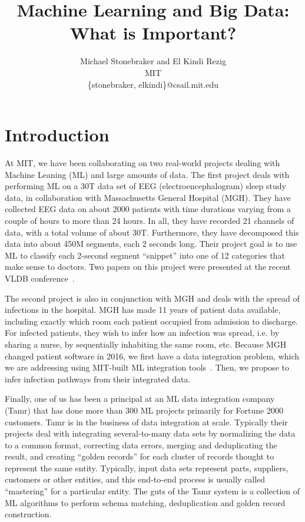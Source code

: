 \documentclass[11pt]{article}
\begin{document}
\title{Machine Learning and Big Data:\\What is Important?}
\author{Michael Stonebraker and El Kindi Rezig\\MIT\\\{stonebraker, elkindi\}@csail.mit.edu}


\section{Introduction}

At MIT, we have been collaborating on two real-world projects dealing with Machine Leaning (ML) and large amounts of data.  The first project deals with performing ML on a 30T data set of EEG (electroencephalogram) sleep study data, in collaboration with Massachusetts General Hospital (MGH).  They have collected EEG data on about 2000 patients with time durations varying from a couple of hours to more than 24 hours.  In all, they have recorded 21 channels of data, with a total volume of about 30T.  Furthermore, they have decomposed this data into about 450M segments, each 2 seconds long.  Their project goal is to use ML to classify each 2-second segment “snippet” into one of 12 categories that make sense to doctors. Two papers on this project were presented at the recent VLDB conference~\cite{1,6}.   

The second project is also in conjunction with MGH and deals with the spread of infections in the hospital.  MGH has made 11 years of patient data available, including exactly which room each patient occupied from admission to discharge.  For infected patients, they wish to infer how an infection was spread, i.e. by sharing a nurse, by sequentially inhabiting the same room, etc.  Because MGH changed patient software in 2016, we first have a data integration problem, which we are addressing using MIT-built ML integration tools~\cite{1,7}.  Then, we propose to infer infection pathways from their integrated data.

Finally, one of us has been a principal at an ML data integration company (Tamr) that has done more than 300 ML projects primarily for Fortune 2000 customers.  Tamr is in the business of data integration at scale.  Typically their projects deal with integrating several-to-many data sets by normalizing the data to a common format, correcting data errors, merging and deduplicating the result, and creating “golden records” for each cluster of records thought to represent the same entity.  Typically, input data sets represent parts, suppliers, customers or other entities, and this end-to-end process is usually called “mastering” for a particular entity.  The guts of the Tamr system is a collection of ML algorithms to perform schema matching, deduplication and golden record construction.
\end{document}

